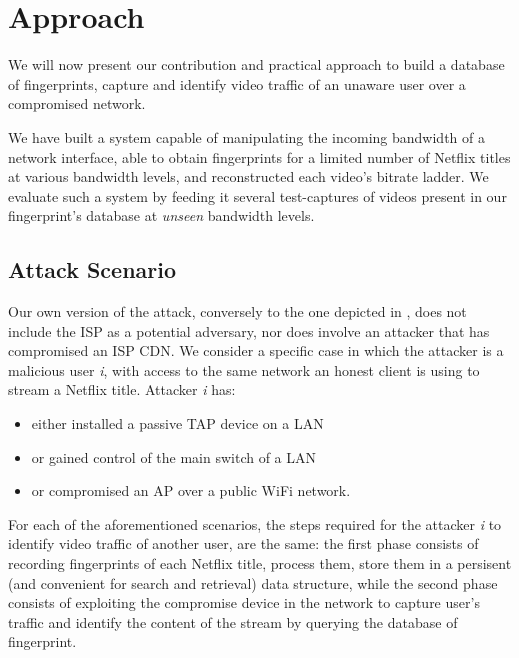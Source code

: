 \chapter{Approach}\label{sec:approach}

We will now present our contribution and practical approach to build a database of
fingerprints, capture and identify video traffic of an unaware user
over a compromised network. 

We have built a system capable of manipulating the incoming bandwidth of a
network interface, able to obtain fingerprints for a limited number of Netflix
titles at various bandwidth levels, and reconstructed each video's bitrate
ladder. We evaluate such a system by feeding it several test-captures of videos
present in our fingerprint's database at \emph{unseen} bandwidth levels.

\section{Attack Scenario}

Our own version of the attack, conversely to the one depicted in
, does not include the ISP as a potential adversary, nor does
involve an attacker that has compromised an ISP CDN.  We consider a specific
case in which the attacker is a malicious user \emph{i}, with access to the
same network an honest client is using to stream a Netflix title. Attacker
\emph{i} has:

\begin{itemize}
    \item either installed a passive TAP device on a LAN
    \item or gained control of the main switch of a LAN
    \item or compromised an AP over a public WiFi network.
\end{itemize}


For each of the aforementioned scenarios, the steps required for the attacker
\emph{i} to identify video traffic of another user, are the same: the first
phase consists of recording fingerprints of each Netflix title, process them,
store them in a persisent (and convenient for search and retrieval) data
structure, while the second phase consists of exploiting the compromise device
in the network to capture user's traffic and identify the content of the stream
by querying the database of fingerprint.

